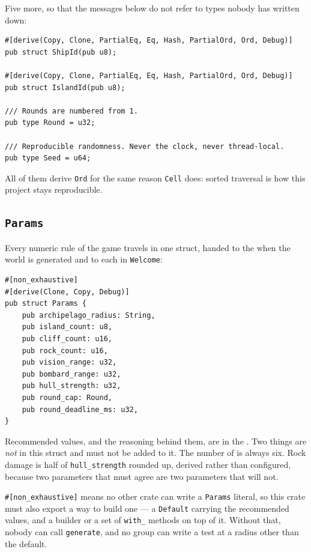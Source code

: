 \documentclass{article}
\begin{document}
Five more, so that the messages below do not refer to types nobody has written down:

\begin{lstlisting}
#[derive(Copy, Clone, PartialEq, Eq, Hash, PartialOrd, Ord, Debug)]
pub struct ShipId(pub u8);

#[derive(Copy, Clone, PartialEq, Eq, Hash, PartialOrd, Ord, Debug)]
pub struct IslandId(pub u8);

/// Rounds are numbered from 1.
pub type Round = u32;

/// Reproducible randomness. Never the clock, never thread-local.
pub type Seed = u64;
\end{lstlisting}

All of them derive \texttt{Ord} for the same reason \texttt{Cell} does: sorted traversal is how
this project stays reproducible.

\subsection{\texttt{Params}}
\label{proto:params}

Every numeric rule of the game travels in one struct, handed to the \chart{} when the world is
generated and to each \ship{} in \texttt{Welcome}:

\begin{lstlisting}
#[non_exhaustive]
#[derive(Clone, Copy, Debug)]
pub struct Params {
    pub archipelago_radius: String,
    pub island_count: u8,
    pub cliff_count: u16,
    pub rock_count: u16,
    pub vision_range: u32,
    pub bombard_range: u32,
    pub hull_strength: u32,
    pub round_cap: Round,
    pub round_deadline_ms: u32,
}
\end{lstlisting}

Recommended values, and the reasoning behind them, are in the \MD. Two things are \emph{not} in
this struct and must not be added to it. The number of \ships{} is always six. Rock damage is
half of \texttt{hull\_strength} rounded up, derived rather than configured, because two parameters
that must agree are two parameters that will not.

\texttt{\#[non\_exhaustive]} means no other crate can write a \texttt{Params} literal, so this
crate must also export a way to build one --- a \texttt{Default} carrying the recommended values,
and a builder or a set of \texttt{with\_} methods on top of it. Without that, nobody can call
\texttt{generate}, and no group can write a test at a radius other than the default.
\end{document}
